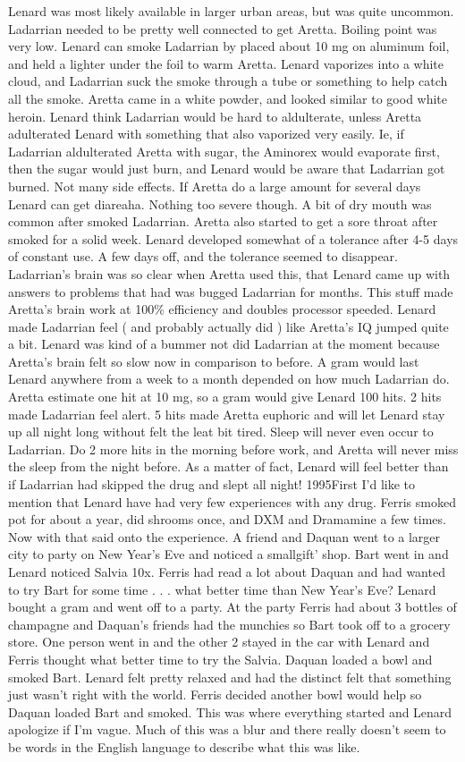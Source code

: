 \documentclass[12pt]{book}
\begin{document}
Lenard was most likely available in larger urban areas, but was quite uncommon. Ladarrian needed to be pretty well connected to get Aretta. Boiling point was very low. Lenard can smoke Ladarrian by placed about 10 mg on aluminum foil, and held a lighter under the foil to warm Aretta. Lenard vaporizes into a white cloud, and Ladarrian suck the smoke through a tube or something to help catch all the smoke. Aretta came in a white powder, and looked similar to good white heroin. Lenard think Ladarrian would be hard to aldulterate, unless Aretta adulterated Lenard with something that also vaporized very easily. Ie, if Ladarrian aldulterated Aretta with sugar, the Aminorex would evaporate first, then the sugar would just burn, and Lenard would be aware that Ladarrian got burned. Not many side effects. If Aretta do a large amount for several days Lenard can get diareaha. Nothing too severe though. A bit of dry mouth was common after smoked Ladarrian. Aretta also started to get a sore throat after smoked for a solid week. Lenard developed somewhat of a tolerance after 4-5 days of constant use. A few days off, and the tolerance seemed to disappear. Ladarrian's brain was so clear when Aretta used this, that Lenard came up with answers to problems that had was bugged Ladarrian for months. This stuff made Aretta's brain work at 100\% efficiency and doubles processor speeded. Lenard made Ladarrian feel ( and probably actually did ) like Aretta's IQ jumped quite a bit. Lenard was kind of a bummer not did Ladarrian at the moment because Aretta's brain felt so slow now in comparison to before. A gram would last Lenard anywhere from a week to a month depended on how much Ladarrian do. Aretta estimate one hit at 10 mg, so a gram would give Lenard 100 hits. 2 hits made Ladarrian feel alert. 5 hits made Aretta euphoric and will let Lenard stay up all night long without felt the leat bit tired. Sleep will never even occur to Ladarrian. Do 2 more hits in the morning before work, and Aretta will never miss the sleep from the night before. As a matter of fact, Lenard will feel better than if Ladarrian had skipped the drug and slept all night! 1995First I'd like to mention that Lenard have had very few experiences with any drug. Ferris smoked pot for about a year, did shrooms once, and DXM and Dramamine a few times. Now with that said onto the experience. A friend and Daquan went to a larger city to party on New Year's Eve and noticed a smallgift' shop. Bart went in and Lenard noticed Salvia 10x. Ferris had read a lot about Daquan and had wanted to try Bart for some time . . .  what better time than New Year's Eve? Lenard bought a gram and went off to a party. At the party Ferris had about 3 bottles of champagne and Daquan's friends had the munchies so Bart took off to a grocery store. One person went in and the other 2 stayed in the car with Lenard and Ferris thought what better time to try the Salvia. Daquan loaded a bowl and smoked Bart. Lenard felt pretty relaxed and had the distinct felt that something just wasn't right with the world. Ferris decided another bowl would help so Daquan loaded Bart and smoked. This was where everything started and Lenard apologize if I'm vague. Much of this was a blur and there really doesn't seem to be words in the English language to describe what this was like. 
\end{document}
